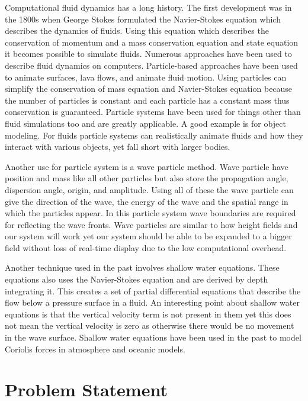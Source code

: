 \documentclass[12pt,titlepage]{article}
\begin{document}
Computational fluid dynamics has a long history. The first development was in 
the 1800s when George Stokes formulated the Navier-Stokes equation which 
describes the dynamics of fluids. Using this equation which describes the 
conservation of momentum and a mass conservation equation and state equation it 
becomes possible to simulate fluids. \cite{particle}
Numerous approaches have been used to describe fluid dynamics on computers. 
Particle-based approaches have been used to animate surfaces, lava flows, and 
animate fluid motion. \cite{smooth}\cite{dynamic}\cite{implicit} Using 
particles can simplify the conservation of mass equation and Navier-Stokes 
equation because the number of particles is constant and each particle has a 
constant mass thus conservation is guaranteed.
Particle systems have been used for things other than fluid simulations too and 
are greatly applicable. A good example is for object modeling. \cite{oriented} 
For fluids 
particle systems can realistically animate fluids and how they interact with 
various objects, yet fall short with larger bodies. \cite{particle}

Another use for particle system is a wave particle method. Wave particle have 
position and mass like all other particles but also store the propagation 
angle, dispersion angle, origin, and amplitude. Using all of these the wave 
particle can give the direction of the wave, the energy of the wave and the 
spatial range in which the particles appear. In this particle system wave 
boundaries are required for reflecting the wave fronts. \cite{realtime} Wave 
particles are similar to how height fields and our system will work yet our 
system should be able to be expanded to a bigger field without loss of 
real-time display due to the low computational overhead.

Another technique used in the past involves shallow water equations. These 
equations also uses the Navier-Stokes equation and are derived by depth 
integrating it. This creates a set of partial differential equations that 
describe the flow below a pressure surface in a fluid.  An interesting point 
about shallow water equations is that the vertical velocity term is not present 
in them yet this does not mean the vertical velocity is zero as otherwise there 
would be no movement in the wave surface. Shallow water equations have been 
used in the past to model Coriolis forces in atmosphere and oceanic models. 
\cite{shalloweq}


\section{Problem Statement}
\end{document}
